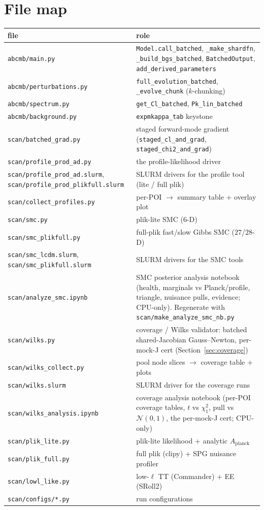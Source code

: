 \documentclass[11pt]{article}
\newcommand{\code}[1]{\texttt{\small #1}}
\newcommand{\file}[1]{\texttt{\small #1}}
\newcommand{\chisq}{\chi^2}
\begin{document}
\section{File map}
\label{app:files}
\begin{longtable}{p{}p{}}
\toprule
file & role \\
\midrule
\endhead
\file{abcmb/main.py} & \code{Model.call\_batched}, \code{\_make\_shardfn},
\code{\_build\_bgs\_batched}, \code{BatchedOutput}, \code{add\_derived\_parameters} \\
\file{abcmb/perturbations.py} & \code{full\_evolution\_batched},
\code{\_evolve\_chunk} ($k$-chunking) \\
\file{abcmb/spectrum.py} & \code{get\_Cl\_batched}, \code{Pk\_lin\_batched} \\
\file{abcmb/background.py} & \code{expmkappa\_tab} keystone \\
\file{scan/batched\_grad.py} & staged forward-mode gradient
(\code{staged\_cl\_and\_grad}, \code{staged\_chi2\_and\_grad}) \\
\file{scan/profile\_prod\_ad.py} & the profile-likelihood driver \\
\file{scan/profile\_prod\_ad.slurm}, \file{scan/profile\_prod\_plikfull.slurm} & SLURM drivers for the profile tool (lite / full plik) \\
\file{scan/collect\_profiles.py} & per-POI $\to$ summary table + overlay plot \\
\file{scan/smc.py} & plik-lite SMC ($6$-D) \\
\file{scan/smc\_plikfull.py} & full-plik fast/slow Gibbs SMC ($27$/$28$-D) \\
\file{scan/smc\_lcdm.slurm}, \file{scan/smc\_plikfull.slurm} & SLURM drivers for the SMC tools \\
\file{scan/analyze\_smc.ipynb} & SMC posterior analysis notebook (health, marginals
vs Planck/profile, triangle, nuisance pulls, evidence; CPU-only). Regenerate with
\file{scan/make\_analyze\_smc\_nb.py} \\
\file{scan/wilks.py} & coverage / Wilks validator: batched shared-Jacobian
Gauss--Newton, per-mock-J cert (Section~\ref{sec:coverage}) \\
\file{scan/wilks\_collect.py} & pool node slices $\to$ coverage table + plots \\
\file{scan/wilks.slurm} & SLURM driver for the coverage runs \\
\file{scan/wilks\_analysis.ipynb} & coverage analysis notebook (per-POI coverage
tables, $t$ vs $\chisq_1$, pull vs $\mathcal N(0,1)$, the per-mock-J cert; CPU-only) \\
\file{scan/plik\_lite.py} & plik-lite likelihood + analytic $A_{\mathrm{planck}}$ \\
\file{scan/plik\_full.py} & full plik (clipy) + SPG nuisance profiler \\
\file{scan/lowl\_like.py} & low-$\ell$ TT (Commander) + EE (SRoll2) \\
\file{scan/configs/*.py} & run configurations \\
\bottomrule
\end{longtable}
\end{document}
